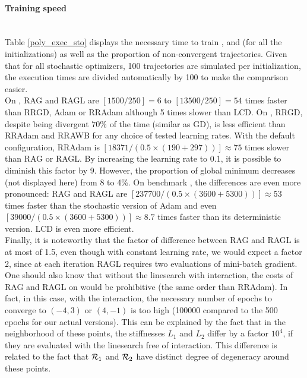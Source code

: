 \paragraph{Training speed}
~~\\
Table \ref{poly_exec_sto} displays the necessary time to train \polyTwo, \polyThree and \polyFive  (for all the initializations) as well as the proportion of non-convergent trajectories. Given that for all stochastic optimizers, 100 trajectories are simulated per initialization, the execution times are divided automatically by 100 to make the comparison easier. \\
On \polyTwo, RAG and RAGL are $\left[1500/250\right]=6$ to $\left[13500/250\right]=54$ times faster than RRGD, Adam or RRAdam although 5 times slower than LCD. On \polyThree, RRGD,
despite being divergent $70\%$ of the time (similar as GD), is less efficient than RRAdam and RRAWB for any choice of tested learning rates. With the default configuration, RRAdam
is $\left[18371/(0.5\times(190+297)) \right] \approx 75$ times slower than RAG or RAGL. By increasing the learning rate to 0.1, it is possible to diminish this factor by 9.
However, the proportion of global minimum decreases (not displayed here) from 8 to 4\%. On benchmark \polyFive, the differences are even more pronounced: RAG and RAGL are $\left[237700/(0.5\times(3600+5300))\right] \approx 53$ times faster than the stochastic version of Adam and even $\left[39000/(0.5\times (3600+5300))\right]\approx8.7$ times faster than its deterministic version. LCD is even more efficient. \\
Finally, it is noteworthy that the factor of difference between RAG and RAGL is at most of 1.5, even though with constant learning rate, we would expect a factor 2, since at each
iteration RAGL requires two evaluations of mini-batch gradient. One should also know that without the linesearch with interaction, the costs of RAG and RAGL on \polyFive would be
prohibitive (the same order than RRAdam). In fact, in this case, with the interaction, the necessary number of epochs to converge to $(-4,3)$ or $(4,-1)$ is too high (100000
compared to the 500 epochs for our actual versions). This can be explained by the fact that in the neighborhood of these points, the stiffnesses $L_1$ and $L_2$ differ by a factor $10^4$, if they are evaluated with the linesearch free of interaction. This difference is related to the fact that $\mathcal{R}_1$ and $\mathcal{R}_2$ have distinct degree of degeneracy around these points. 

